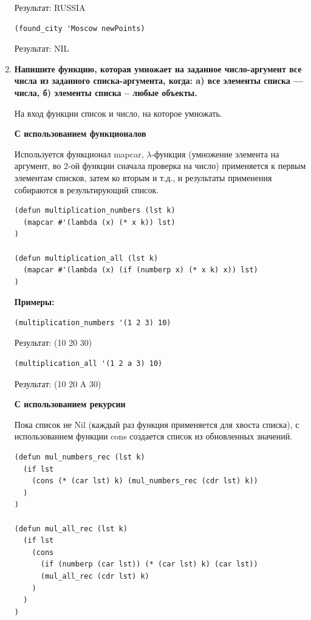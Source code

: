 \documentclass[a4paper,14pt]{extreport} %
\begin{document}
\begin{enumerate}
Результат: RUSSIA

\begin{lstlisting}
(found_city 'Moscow newPoints)
\end{lstlisting}

Результат: NIL

\item \textbf{Напишите функцию, которая умножает на заданное число-аргумент все числа
из заданного списка-аргумента, когда: a) все элементы списка --- числа, б) элементы списка -- любые объекты.}

На вход функции список и число, на которое умножать. 

\textbf{С использованием функционалов}

Используется функционал mapcar, $\lambda$-функция (умножение элемента на аргумент, во 2-ой функции сначала проверка на число) применяется к первым элементам списков, затем ко вторым и т.д., и результаты применения собираются в результирующий список.

\begin{lstlisting}
(defun multiplication_numbers (lst k)
  (mapcar #'(lambda (x) (* x k)) lst)
)

(defun multiplication_all (lst k)
  (mapcar #'(lambda (x) (if (numberp x) (* x k) x)) lst)
)
\end{lstlisting}

\textbf{Примеры:}

\begin{lstlisting}
(multiplication_numbers '(1 2 3) 10)
\end{lstlisting}

Результат: (10 20 30)

\begin{lstlisting}
(multiplication_all '(1 2 a 3) 10)
\end{lstlisting}

Результат: (10 20 A 30)

\textbf{С использованием рекурсии}

Пока список не Nil (каждый раз функция применяется для хвоста списка), с использованием функции cons создается список из обновленных значений. 

\begin{lstlisting}
(defun mul_numbers_rec (lst k)
  (if lst
    (cons (* (car lst) k) (mul_numbers_rec (cdr lst) k))
  )
)

(defun mul_all_rec (lst k)
  (if lst
    (cons
      (if (numberp (car lst)) (* (car lst) k) (car lst))
      (mul_all_rec (cdr lst) k)
    )
  )
)
\end{lstlisting}


\end{enumerate}
\end{document}
